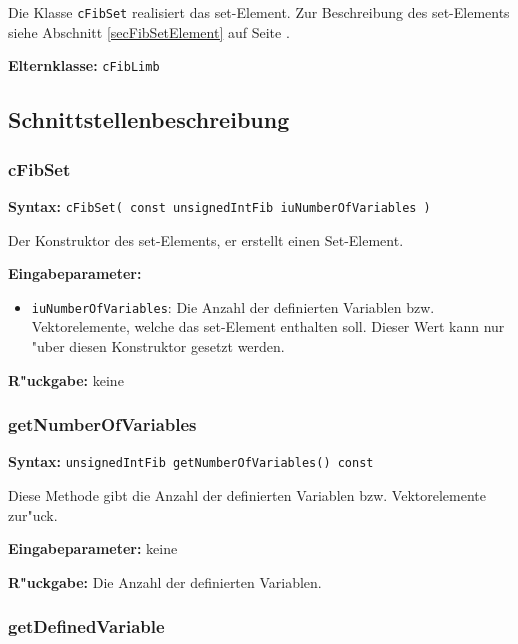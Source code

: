 Die Klasse \verb|cFibSet| realisiert das set-Element.
Zur Beschreibung des set-Elements siehe Abschnitt \ref{secFibSetElement} auf Seite \pageref{secFibSetElement} .

\bigskip\noindent
\textbf{Elternklasse:} \verb|cFibLimb|


\subsection{Schnittstellenbeschreibung}

\subsubsection{cFibSet}

\textbf{Syntax:} \verb|cFibSet( const unsignedIntFib iuNumberOfVariables )|

\bigskip\noindent
Der Konstruktor des set-Elements, er erstellt einen Set-Element.

\bigskip\noindent
\textbf{Eingabeparameter:}
\begin{itemize}
 \item \verb|iuNumberOfVariables|: Die Anzahl der definierten Variablen bzw. Vektorelemente, welche das set-Element enthalten soll. Dieser Wert kann nur "uber diesen Konstruktor gesetzt werden.
\end{itemize}

\bigskip\noindent
\textbf{R"uckgabe:} keine


\subsubsection{getNumberOfVariables}

\textbf{Syntax:} \verb|unsignedIntFib getNumberOfVariables() const|

\bigskip\noindent
Diese Methode gibt die Anzahl der definierten Variablen bzw. Vektorelemente zur"uck.

\bigskip\noindent
\textbf{Eingabeparameter:} keine

\bigskip\noindent
\textbf{R"uckgabe:} Die Anzahl der definierten Variablen.


\subsubsection{getDefinedVariable}

